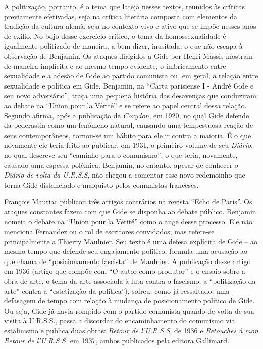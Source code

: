 A politização, portanto, é o tema que lateja nesses textos, reunidos às
críticas previamente efetivadas, seja na crítica literária composta com
elementos da tradição da cultura alemã, seja no contexto vivo e ativo
que se impõe nesses anos de exílio. No bojo desse exercício crítico, o
tema da homossexualidade é igualmente politizado de maneira, a bem
dizer, inusitada, o que não escapa à observação de Benjamin. Os ataques
dirigidos a Gide por Henri Massis mostram de maneira implícita e ao
mesmo tempo evidente, o imbricamento entre sexualidade e a adesão de
Gide ao partido comunista ou, em geral, a relação entre sexualidade e
política em Gide. Benjamin, na ``Carta parisiense I - André Gide e seu
novo adversário'', traça uma pequena história das desavenças que
conduziram ao debate na ``Union pour la Vérité'' e se refere ao papel
central dessa relação. Segundo afirma, após a publicação de
\emph{Corydon}, em 1920, no qual Gide defende da pederastia como um
fenômeno natural, causando uma tempestuosa reação de seus
contemporâneos, tornou-se um hábito para ele ir contra a maioria. É o
que novamente ele teria feito ao publicar, em 1931, o primeiro volume de
seu \emph{Diário}, no qual descreve seu ``caminho para o comunismo'', o
que teria, novamente, causado uma espessa polêmica. Benjamin, no
entanto, apesar de conhecer o \emph{Diário de volta da U.R.S.S}, não
chegou a comentar esse novo redemoinho que torna Gide distanciado e
malquisto pelos comunistas franceses.

François Mauriac publicou três artigos contrários na revista ``Echo de
Paris''. Os ataques constantes fazem com que Gide se disponha ao debate
público. Benjamin nomeia o debate na ``Union pour la Vérité'' como o
auge desse processo. Ele não menciona Fernandez ou o rol de escritores
convidados, mas refere-se principalmente a Thierry Maulnier. Seu texto é
uma defesa explícita de Gide -- ao mesmo tempo que defende seu
engajamento político, formula uma acusação ao que chama de
``posicionamento fascista'' de Maulnier. A publicação desse artigo em
1936 (artigo que compõe com ``O autor como produtor'' e o ensaio sobre a
obra de arte, o tema da arte associada à luta contra o fascismo, a
``politização da arte'' contra a ``estetização da política''), sofreu,
como já ressaltado, uma defasagem de tempo com relação à mudança de
posicionamento político de Gide. Ou seja, Gide já havia rompido com o
partido comunista quando de volta de sua visita à U.R.S.S., passa a
discordar do encaminhamento do comunismo via estalinismo e publica duas
obras: \emph{Retour de l'U.R.S.S}. de 1936 e \emph{Retouches à mon
Retour de l'U.R.S.S.} em 1937, ambos publicados pela editora Gallimard.

